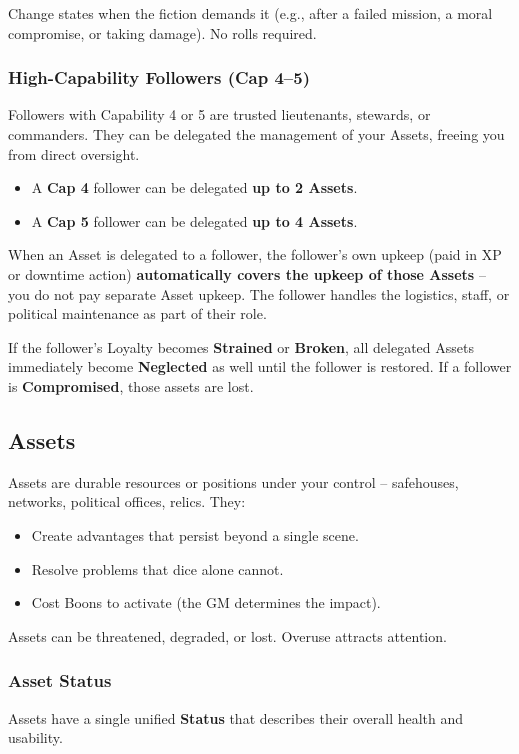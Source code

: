 Change states when the fiction demands it (e.g., after a failed mission, a moral compromise, or taking damage). No rolls required.

\subsubsection{High-Capability Followers (Cap 4--5)}
\label{sec:high-cap-followers}
Followers with Capability 4 or 5 are trusted lieutenants, stewards, or commanders. They can be delegated the management of your Assets, freeing you from direct oversight.

\begin{itemize}
  \item A \textbf{Cap 4} follower can be delegated \textbf{up to 2 Assets}.
  \item A \textbf{Cap 5} follower can be delegated \textbf{up to 4 Assets}.
\end{itemize}

When an Asset is delegated to a follower, the follower's own upkeep (paid in XP or downtime action) \textbf{automatically covers the upkeep of those Assets} -- you do not pay separate Asset upkeep. The follower handles the logistics, staff, or political maintenance as part of their role.

If the follower's Loyalty becomes \textbf{Strained} or \textbf{Broken}, all delegated Assets immediately become \textbf{Neglected} as well until the follower is restored. If a follower is \textbf{Compromised}, those assets are lost.

\subsection{Assets}
Assets are durable resources or positions under your control -- safehouses, networks, political offices, relics. They:
\begin{itemize}
  \item Create advantages that persist beyond a single scene.
  \item Resolve problems that dice alone cannot.
  \item Cost Boons to activate (the GM determines the impact).
\end{itemize}
Assets can be threatened, degraded, or lost. Overuse attracts attention.

\subsubsection{Asset Status}
Assets have a single unified \textbf{Status} that describes their overall health and usability.

